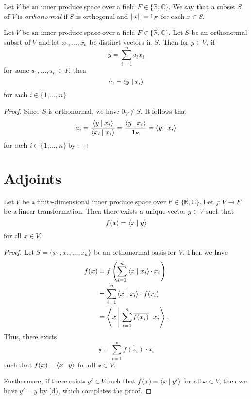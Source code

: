 \begin{definition}
  Let $V$ be an inner produce space over a field
  $F \in \{\mathbb{R}, \mathbb{C}\}$.
  We say that a subset $S$ of $V$ is \emph{orthonormal} if $S$ is orthogonal
  and $\left\Vert x \right\Vert = 1_F$ for each $x \in S$.
\end{definition}

\begin{theorem}
  \label{thm:orthonormal-decomposition}
  Let $V$ be an inner produce space over a field
  $F \in \{\mathbb{R}, \mathbb{C}\}$.
  Let $S$ be an orthonormal subset of $V$ and let
  $x_1, \dots, x_n$ be distinct vectors in $S$.
  Then for $y \in V$, if
  \begin{equation*}
    y = \sum_{i=1}^n a_ix_i
  \end{equation*}
  for some $a_1, \dots, a_n \in F$, then
  \begin{equation*}
    a_i = \left\langle y \; \middle| \; x_i \right\rangle
  \end{equation*}
  for each $i \in \{1, \dots, n\}$.
\end{theorem}
\begin{proof}
  Since $S$ is orthonormal, we have $0_V \notin S$.
  It follows that
  \begin{equation*}
    a_i
    = \frac{\left\langle y \; \middle| \; x_i \right\rangle}{\left\langle x_i \; \middle| \; x_i \right\rangle}
    = \frac{\left\langle y \; \middle| \; x_i \right\rangle}{1_F}
    = \left\langle y \; \middle| \; x_i \right\rangle
  \end{equation*}
  for each $i \in \{1, \dots, n\}$ by .
\end{proof}

\section{Adjoints}
\begin{theorem}
  \label{thm:functional}
  Let $V$ be a finite-dimensional inner produce space over
  $F \in \{\mathbb{R}, \mathbb{C}\}$.
  Let $f: V \to F$ be a linear transformation.
  Then there exists a unique vector $y \in V$ such that
  \begin{equation*}
    f(x) = \left\langle x \; \middle| \; y \right\rangle
  \end{equation*}
  for all $x \in V$.
\end{theorem}
\begin{proof}
  Let $S = \{x_1, x_2, \dots, x_n\}$ be an orthonormal basis
  for $V$.
  Then we have
  \begin{align*}
    f(x)
    &= f\left(\sum_{i=1}^n \left\langle x \; \middle| \; x_i \right\rangle \cdot x_i\right) \\
    &= \sum_{i=1}^n \left\langle x \; \middle| \; x_i \right\rangle \cdot f(x_i) \\
    &= \left\langle x \; \middle| \; \sum_{i=1}^n \overline{f(x_i)} \cdot x_i \right\rangle.
  \end{align*}
  Thus, there exists
  \begin{equation*}
    y = \sum_{i=1}^n \overline{f(x_i)} \cdot x_i
  \end{equation*}
  such that $f(x) = \left\langle x \; \middle| \; y \right\rangle$ for all $x \in V$.

  Furthermore, if there exists $y' \in V$ such that $f(x) = \left\langle x \; \middle| \; y' \right\rangle$
  for all $x \in V$, then we have $y' = y$ by 
  (d), which completes the proof.
\end{proof}

